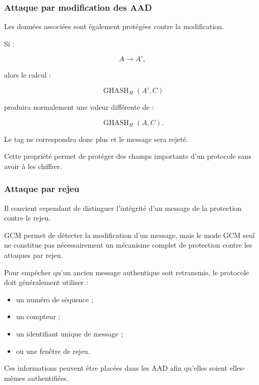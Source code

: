 \documentclass[12pt,a4paper]{article}
\begin{document}
\subsubsection{Attaque par modification des AAD}

Les données associées sont également protégées contre la modification.

Si :

\begin{equation}
A \longrightarrow A',
\end{equation}

alors le calcul :

\begin{equation}
\operatorname{GHASH}_H(A',C)
\end{equation}

produira normalement une valeur différente de :

\begin{equation}
\operatorname{GHASH}_H(A,C).
\end{equation}

Le tag ne correspondra donc plus et le message sera rejeté.

Cette propriété permet de protéger des champs importants d'un
protocole sans avoir à les chiffrer.

\subsubsection{Attaque par rejeu}

Il convient cependant de distinguer l'intégrité d'un message de la
protection contre le rejeu.

GCM permet de détecter la modification d'un message, mais le mode
GCM seul ne constitue pas nécessairement un mécanisme complet de
protection contre les attaques par rejeu.

Pour empêcher qu'un ancien message authentique soit retransmis, le
protocole doit généralement utiliser :

\begin{itemize}
    \item un numéro de séquence ;
    \item un compteur ;
    \item un identifiant unique de message ;
    \item ou une fenêtre de rejeu.
\end{itemize}

Ces informations peuvent être placées dans les AAD afin qu'elles
soient elles-mêmes authentifiées.
\end{document}
